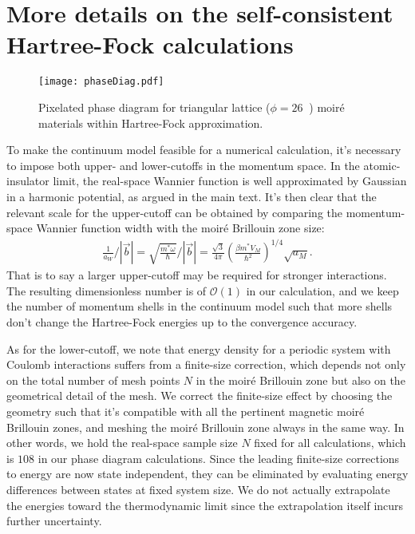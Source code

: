 \documentclass[%
 reprint,
 superscriptaddress,
 amsmath,amssymb,
 aps,
 prx,
 floatfix,
]{revtex4-2}
\newcommand{\<}{\langle}
\renewcommand{\>}{\rangle}
\renewcommand{\(}{\left(}
\renewcommand{\)}{\right)}
\renewcommand{\[}{\left[}
\renewcommand{\]}{\right]}
\DeclareMathOperator{\degree}{^{\circ}}
\begin{document}
\appendix


\section{\label{app:cutoff}More details on the self-consistent Hartree-Fock calculations}

\begin{figure}[!t]
    \centering
    \texttt{[image: phaseDiag.pdf]}
    \caption{Pixelated phase diagram for triangular lattice ($\phi=26\degree$) moir\'e materials within Hartree-Fock approximation.}
    \label{fig:pixel}
\end{figure}

To make the continuum model feasible for a numerical calculation, it's necessary to impose both upper- and lower-cutoffs in the momentum space. In the atomic-insulator limit, the real-space Wannier function is well approximated by Gaussian in a harmonic potential, as argued in the main text. It's then clear that the relevant scale for the upper-cutoff can be obtained by comparing the momentum-space Wannier function width with the moir\'e Brillouin zone size:
\begin{align}
    \frac{1}{a_W}\bigg/|\vec{b}| = \sqrt{\frac{m^*\omega}{\hbar}}\bigg/|\vec{b}| = \frac{\sqrt{3}}{4\pi}\(\frac{\beta m^*V_M}{\hbar^2}\)^{1/4}\sqrt{a_M}.
\end{align} 
That is to say a larger upper-cutoff may be required for stronger interactions. The resulting dimensionless number is of $\mathcal{O}(1)$ in our calculation, and we keep the number of momentum shells in the continuum model such that more shells don't change the Hartree-Fock energies up to the convergence accuracy. 

As for the lower-cutoff, we note that energy density for a periodic system with Coulomb interactions suffers from a finite-size correction, which depends not only on the total number of mesh points $N$ in the moir\'e Brillouin zone but also on the geometrical detail of the mesh. We correct the finite-size effect by choosing the geometry such that it's compatible with all the pertinent magnetic moir\'e Brillouin zones, and meshing the moir\'e Brillouin zone always in the same way. In other words, we hold the real-space sample size $N$ fixed for all calculations, which is $108$ in our phase diagram calculations. Since the leading finite-size corrections to energy are now state independent, they can be 
eliminated by evaluating energy differences between states at fixed system size.
We do not actually extrapolate the energies toward the thermodynamic limit since the extrapolation itself incurs further uncertainty.
\end{document}
